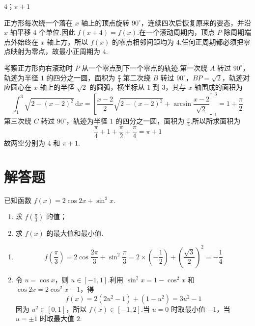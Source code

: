 \begin{answer}
\(4\)；\(\pi + 1\)
\end{answer}

\begin{solution}
正方形每次绕一个落在 \(x\) 轴上的顶点旋转 \(90^{\circ}\)，连续四次后恢复原来的姿态，并沿 \(x\) 轴平移 \(4\) 个单位.因此 \(f(x+4)=f(x)\).在一个滚动周期内，顶点 \(P\) 除周期端点外始终在 \(x\) 轴上方，所以 \(f(x)\) 的零点相邻间距均为 \(4\).任何正周期都必须把零点映射为零点，故最小正周期为 \(4\).

考察正方形向右滚动时 \(P\) 从一个零点到下一个零点的轨迹.第一次绕 \(A\) 转过 \(90^{\circ}\)，轨迹为半径 \(1\) 的四分之一圆，面积为 \(\frac{\pi}{4}\).第二次绕 \(B\) 转过 \(90^{\circ}\)，\(BP=\sqrt{2}\)，轨迹对应圆心在 \(x\) 轴上的半径 \(\sqrt{2}\) 的圆弧，横坐标从 \(1\) 到 \(3\)，其与 \(x\) 轴围成的面积为
\[
\int_{1}^{3}\sqrt{2-(x-2)^2}\,\mathrm{d}x
=\left[\frac{x-2}{2}\sqrt{2-(x-2)^2}+\arcsin\frac{x-2}{\sqrt{2}}\right]_{1}^{3}
=1+\frac{\pi}{2}
\]
第三次绕 \(C\) 转过 \(90^{\circ}\)，轨迹为半径 \(1\) 的四分之一圆，面积为 \(\frac{\pi}{4}\).所以所求面积为
\[
\frac{\pi}{4}+1+\frac{\pi}{2}+\frac{\pi}{4}=\pi+1
\]
故两空分别为 \(4\) 和 \(\pi+1\).
\end{solution}

\section{解答题}

\begin{problem}
已知函数 \(f(x)=2\cos 2x+\sin^2 x\).

\begin{enumerate}
\item 求 \( f\left(\frac{\pi}{3}\right) \) 的值；
\item 求 \( f(x) \) 的最大值和最小值.
\end{enumerate}
\end{problem}

\begin{solution}
\begin{enumerate}
\item
\[
f\left(\frac{\pi}{3}\right)=2\cos\frac{2\pi}{3}+\sin^2\frac{\pi}{3}=2\times\left(-\frac{1}{2}\right)+\left(\frac{\sqrt{3}}{2}\right)^2=-\frac{1}{4}
\]

\item 令 \(u=\cos x\)，则 \(u\in[-1,1]\).利用 \(\sin^2x=1-\cos^2x\) 和 \(\cos2x=2\cos^2x-1\)，得
\[
f(x)=2(2u^2-1)+(1-u^2)=3u^2-1
\]
因为 \(u^2\in[0,1]\)，所以 \(f(x)\in[-1,2]\).当 \(u=0\) 时取最小值 \(-1\)，当 \(u=\pm1\) 时取最大值 \(2\).
\end{enumerate}
\end{solution}

